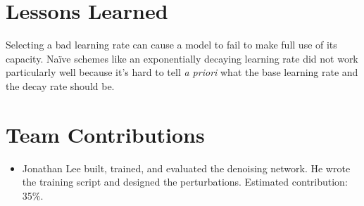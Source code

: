 \documentclass[justified]{article}
\begin{document}
  \section{Lessons Learned}

  Selecting a bad learning rate can cause a model to fail to make full use of its capacity.
  Na\"{i}ve schemes like an exponentially decaying learning rate did not work particularly well because it's hard to tell \textit{a priori} what the base learning rate and the decay rate should be.

  \section{Team Contributions}

  \begin{itemize}
  \item
    Jonathan Lee built, trained, and evaluated the denoising network.
    He wrote the training script and designed the perturbations.
    Estimated contribution: 35\%.
  \end{itemize}
\end{document}
